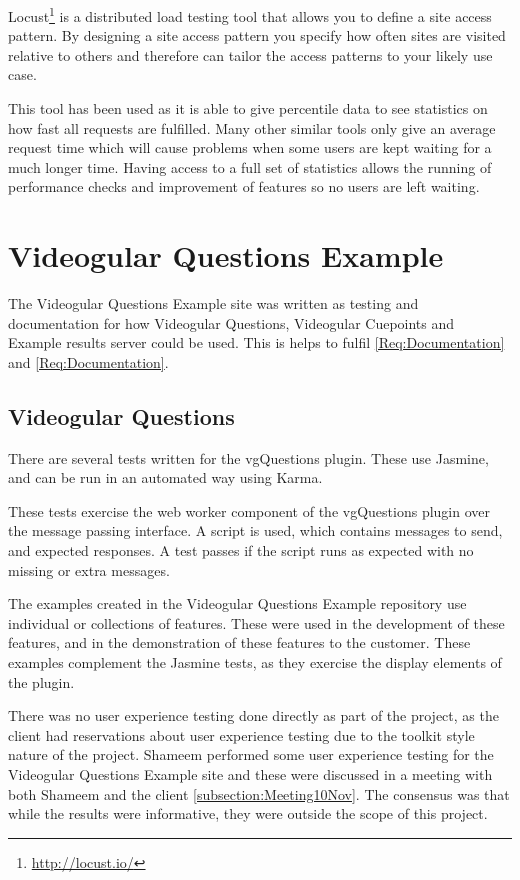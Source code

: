 Locust\footnote{\url{http://locust.io/}} is a distributed load testing tool that allows you to define a site access pattern. By designing a site access pattern you specify how often sites are visited relative to others and therefore can tailor the access patterns to your likely use case.

This tool has been used as it is able to give percentile data to see statistics on how fast all requests are fulfilled. Many other similar tools only give an average request time which will cause problems when some users are kept waiting for a much longer time. Having access to a full set of statistics allows the running of performance checks and improvement of features so no users are left waiting.

\section{Videogular Questions Example} 
\label{Section:Videogular Questions Example}

The Videogular Questions Example site was written as testing and documentation for how Videogular Questions, Videogular Cuepoints and Example results server could be used. This is helps to fulfil \cref{Req:Documentation} and \cref{Req:Documentation}.

\subsection{Videogular Questions}
\label{Subsection:Videogular Questions in example}

There are several tests written for the \gls{vgQuestions} plugin. These use Jasmine, and can be run in an automated way using Karma.

These tests exercise the web worker component of the \gls{vgQuestions} plugin over the message passing interface. A script is used, which contains messages to send, and expected responses. A test passes if the script runs as expected with no missing or extra messages.

The examples created in the Videogular Questions Example repository use individual or collections of features. These were used in the development of these features, and in the demonstration of these features to the customer.  These examples complement the Jasmine tests, as they exercise the display elements of the plugin.

There was no user experience testing done directly as part of the project, as the client had reservations about user experience testing due to the toolkit style nature of the project. Shameem performed some user experience testing for the Videogular Questions Example site and these were discussed in a meeting with both Shameem and the client \autoref{subsection:Meeting10Nov}. The consensus was that while the results were informative, they were outside the scope of this project.


